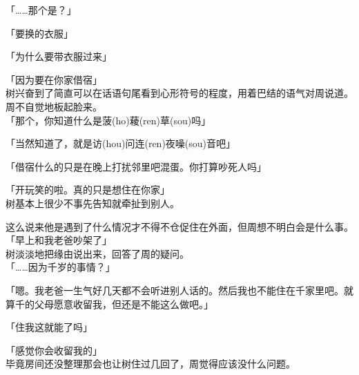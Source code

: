 「……那个是？」

「要换的衣服」

「为什么要带衣服过来」

「因为要在你家借宿」\\

树兴奋到了简直可以在话语句尾看到心形符号的程度，用着巴结的语气对周说道。周不自觉地板起脸来。\\

「那个，你知道什么是菠(ho)薐(ren)草(sou)吗」

「当然知道了，就是访(hou)问连(ren)夜噪(sou)音吧」

「借宿什么的只是在晚上打扰邻里吧混蛋。你打算吵死人吗」

「开玩笑的啦。真的只是想住在你家」\\

树基本上很少不事先告知就牵扯到别人。

这么说来他是遇到了什么情况才不得不仓促住在外面，但周想不明白会是什么事。\\

「早上和我老爸吵架了」\\

树淡淡地把缘由说出来，回答了周的疑问。\\

「……因为千岁的事情？」

「嗯。我老爸一生气好几天都不会听进别人话的。然后我也不能住在千家里吧。就算千的父母愿意收留我，但还是不能这么做吧。」

「住我这就能了吗」

「感觉你会收留我的」\\

毕竟房间还没整理那会也让树住过几回了，周觉得应该没什么问题。\\

